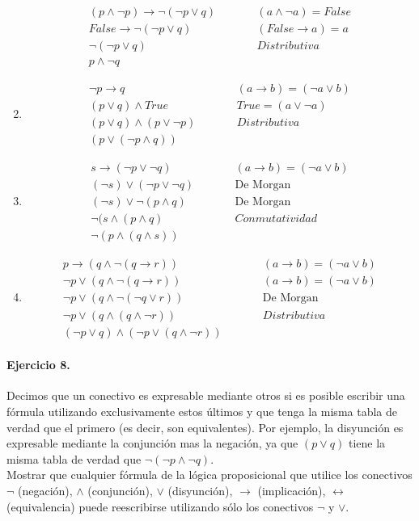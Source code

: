 \documentclass[a4paper]{article}
\begin{document}
\begin{enumerate}[label=\alph*)]
\begin{align*}
(p \wedge \neg p)\rightarrow \neg (\neg p\vee q) & \qquad & (a \wedge \neg a)=False\\
False\rightarrow \neg (\neg p\vee q) & \qquad & (False \rightarrow a)=a\\
\neg (\neg p\vee q) & \qquad & Distributiva\\
p \wedge \neg q
\end{align*}
\item \begin{align*}
 \neg p \rightarrow q & \qquad & (a \rightarrow b)=(\neg a \vee b)\\
 (p \vee q) \wedge True  & \qquad & True=(a \vee \neg a)\\
 (p \vee q) \wedge (p \vee \neg p)  & \qquad & Distributiva\\
 (p \vee (\neg p \wedge q)) 
\end{align*}
\item \begin{align*}
 s \rightarrow (\neg p \vee \neg q) & \qquad & (a \rightarrow b)=(\neg a \vee b)\\
 (\neg s) \vee (\neg p \vee \neg q) & \qquad & \textrm{De Morgan}\\
 (\neg s) \vee \neg(p \wedge q) & \qquad & \textrm{De Morgan}\\
 \neg ( s \wedge (p \wedge q) & \qquad & Conmutatividad\\ 
 \neg (p \wedge (q \wedge s)) 
\end{align*}
\item \begin{align*}
 p \rightarrow (q \wedge \neg (q \rightarrow r)) & \qquad & (a \rightarrow b)=(\neg a \vee b)\\
 \neg p \vee (q \wedge \neg (q \rightarrow r)) & \qquad & (a \rightarrow b)=(\neg a \vee b)\\
 \neg p \vee (q \wedge \neg (\neg q \vee r)) & \qquad & \textrm{De Morgan}\\
 \neg p \vee (q \wedge  (q \wedge \neg r)) & \qquad & Distributiva\\
 (\neg p \vee q)\wedge (\neg p \vee (q \wedge \neg r))
\end{align*}
\end{enumerate}

\paragraph{\textbf{Ejercicio 8.}} Decimos que un conectivo es expresable mediante otros si es posible escribir una fórmula utilizando exclusivamente estos últimos y que tenga la misma tabla de verdad que el primero (es decir, son equivalentes). Por ejemplo, la disyunción es expresable mediante la conjunción mas la negación, ya que $ (p \vee q)$ tiene la misma tabla de verdad que $ \neg ( \neg p \wedge \neg q) $.\\
Mostrar que cualquier fórmula de la lógica proposicional que utilice los conectivos $\neg$ (negación), $\wedge$ (conjunción), $\vee$ (disyunción), $\rightarrow$ (implicación), $\leftrightarrow$ (equivalencia) puede reescribirse utilizando sólo los conectivos $\neg$ y $\vee$. 
\end{document}
